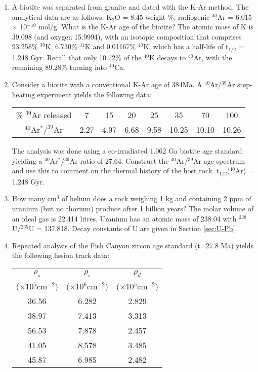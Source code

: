 \begin{enumerate}
\item A biotite was separated from granite and dated with the K-Ar
  method. The analytical data are as follows: K$_2$O = 8.45 weight \%,
  radiogenic $^{40}$Ar = 6.015 $\times$ 10$^{-10}$ mol/g.  What is the
  K-Ar age of the biotite? The atomic mass of K is 39.098 (and oxygen
  15.9994), with an isotopic composition that comprises 93.258\%
  $^{39}$K, 6.730\% $^{41}$K and 0.01167\% $^{40}$K, which has a
  half-life of t$_{1/2}$ = 1.248 Gyr. Recall that only 10.72\% of the
  $^{40}$K decays to $^{40}$Ar, with the remaining 89.28\% turning
  into $^{40}$Ca. 

\item Consider a biotite with a conventional K-Ar age of 384Ma. A
  $^{40}$Ar/$^{39}$Ar step-heating experiment yields the following
  data:

\begin{centering}
\begin{tabular}{c@{~}|@{~}c@{~}c@{~}c@{~}c@{~}c@{~}c@{~}c}
\% $^{39}$Ar released & 7 & 15 & 20 & 25 & 35 & 70 & 100\\
$^{40}$Ar$^*/^{39}$Ar & 2.27 & 4.97 & 6.68 & 9.58 & 10.25 & 10.10 & 10.26 \\
\end{tabular}
\end{centering}

The analysis was done using a co-irradiated 1.062 Ga biotite age
standard yielding a $^{40}$Ar$^*$/$^{39}$Ar-ratio of 27.64.  Construct
the $^{40}$Ar/$^{39}$Ar age spectrum and use this to comment on the
thermal history of the host rock. t$_{1/2}$($^{40}$Ar) = 1.248
Gyr.\\ 

\item How many cm$^3$ of helium does a rock weighing 1 kg and
  containing 2 ppm of uranium (but no thorium) produce after 1 billion
  years? The molar volume of an ideal gas is 22.414 litres. Uranium
  has an atomic mass of 238.04 with $^{238}$U/$^{235}$U =
  137.818. Decay constants of U are given in Section \ref{sec:U-Pb}.

\item Repeated analysis of the Fish Canyon zircon age standard (t=27.8
  Ma) yields the following fission track data:
  
\begin{centering}
\begin{tabular}{ccc}
$\rho_s$ & $\rho_i$ & $\rho_d$ \\
($\times$10$^5$cm$^{-2}$) & ($\times$10$^6$cm$^{-2}$) & ($\times$10$^5$cm$^{-2}$)\\
\hline
36.56 & 6.282 & 2.829 \\
38.97 & 7.413 & 3.313 \\
56.53 & 7.878 & 2.457 \\
41.05 & 8.578 & 3.485 \\
45.87 & 6.985 & 2.482
\end{tabular}
\end{centering}


\end{enumerate}
